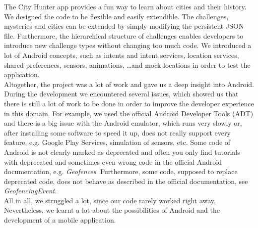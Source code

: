 The City Hunter app provides a fun way to learn about cities and their history. We designed the code to be flexible and easily extendible. The challenges, mysteries and cities can be extended by simply modifying the persistent JSON file. Furthermore, the hierarchical structure of challenges enables developers to introduce new challenge types without changing too much code.
We introduced a lot of Android concepts, such as intents and intent services, location services, shared preferences, sensors, animations, \dots and mock locations in order to test the application.
\noindent
\\ \newline
Altogether, the project was a lot of work and gave us a deep insight into Android. During the development we encountered several issues, which showed us that there is still a lot of work to be done in order to improve the developer experience in this domain. For example, we used the official Android Developer Tools (ADT) and there is a big issue with the Android emulator, which runs very slowly or, after installing some software to speed it up, does not really support every feature, e.g. Google Play Services, simulation of sensors, etc. Some code of Android is not clearly marked as deprecated and often you only find tutorials with deprecated and sometimes even wrong code in the official Android documentation, e.g. \emph{Geofences}. Furthermore, some code, supposed to replace deprecated code, does not behave as described in the official documentation, see \emph{GeofencingEvent}. 
\noindent
\\ \newline
All in all, we struggled a lot, since our code rarely worked right away. Nevertheless, we learnt a lot about the possibilities of Android and the development of a mobile application.
